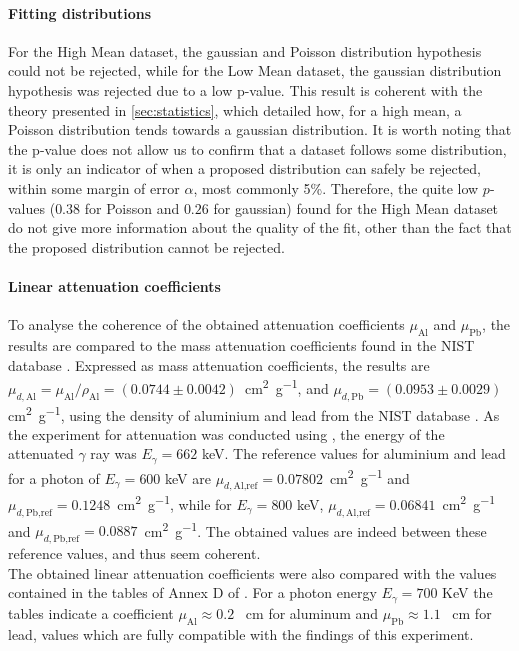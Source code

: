 \paragraph{Fitting distributions}
For the High Mean dataset, the gaussian and Poisson distribution hypothesis could not be rejected, while for the Low Mean dataset, the gaussian distribution hypothesis was rejected due to a low p-value. This result is coherent with the theory presented in \autoref{sec:statistics}, which detailed how, for a high mean, a Poisson distribution tends towards a gaussian distribution. It is worth noting that the p-value does not allow us to confirm that a dataset follows some distribution, it is only an indicator of when a proposed distribution can safely be rejected, within some margin of error \(\alpha\), most commonly 5\%.
Therefore, the quite low \(p\)-values (\(0.38\) for Poisson and \(0.26\) for gaussian) found for the High Mean dataset do not give more information about the quality of the fit, other than the fact that the proposed distribution cannot be rejected.

\paragraph{Linear attenuation coefficients}
To analyse the coherence of the obtained attenuation coefficients \(\mu_\textrm{Al}\) and \(\mu_\textrm{Pb}\), the results are compared to the mass attenuation coefficients found in the NIST database \cite{massic-linear-attenuation}. 
Expressed as mass attenuation coefficients, the results are \linebreak \mbox{\(\mu_{d,\textrm{Al}} = \mu_{\textrm{Al}} / \rho_\textrm{Al} = \left(0.0744 \pm 0.0042\right)\) \si{\centi\meter\squared\per\gram}}, and \(\mu_{d,\textrm{Pb}} = \left(0.0953 \pm 0.0029\right)\) \si{\centi\meter\squared\per\gram}, using the density of aluminium and lead from the NIST database \cite{material-density}. 
As the experiment for attenuation was conducted using \cesium, the energy of the attenuated \(\gamma\) ray was \(E_\gamma = 662\) keV.
The reference values for aluminium and lead for a photon of \(E_\gamma = 600\) keV are \mbox{\(\mu_{d,\textrm{Al,ref}} = 0.07802\) \si{\centi\meter\squared\per\gram}} and \mbox{\(\mu_{d,\textrm{Pb,ref}} = 0.1248\) \si{\centi\meter\squared\per\gram}}, while for \(E_\gamma = 800\) keV, \mbox{\(\mu_{d,\textrm{Al,ref}} = 0.
06841\) \si{\centi\meter\squared\per\gram}} and \linebreak \mbox{\(\mu_{d,\textrm{Pb,ref}} = 0.0887\) \si{\centi\meter\squared\per\gram}}. 
The obtained values are indeed between these reference values, and thus seem coherent. \\
The obtained linear attenuation coefficients were also compared 
with the values contained in the tables of Annex D of \cite{notice_generale}.
For a photon energy $E_{\gamma} = 700$ KeV the tables indicate a coefficient 
$\mu_{\mathrm{Al}} \approx 0.2$ \unit{\per\cm} for aluminum and 
$\mu_{\mathrm{Pb}} \approx 1.1$ \unit{\per\cm} for lead,
values which are fully compatible with the findings of this experiment.

